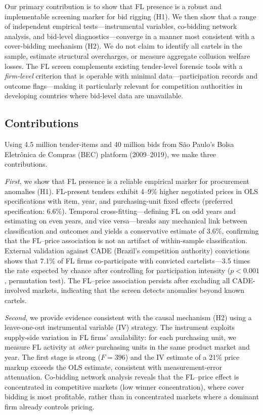 \noindent Our primary contribution is to show that FL presence is a
robust and implementable screening marker for bid rigging (H1). We then
show that a range of independent empirical tests---instrumental
variables, co-bidding network analysis, and bid-level
diagnostics---converge in a manner most consistent with a cover-bidding
mechanism (H2). We do not claim to identify all cartels in the sample,
estimate structural overcharges, or measure aggregate collusion welfare
losses. The FL screen complements existing tender-level forensic tools
\citep{imhof2019detecting} with a \emph{firm-level} criterion that is
operable with minimal data---participation records and outcome
flags---making it particularly relevant for competition authorities in
developing countries where bid-level data are unavailable.

\subsection{Contributions}

Using 4.5 million tender-items and 40 million bids from S\~ao Paulo's
Bolsa Eletr\^onica de Compras (BEC) platform (2009--2019), we make three
contributions.

\emph{First}, we show that FL presence is a reliable empirical marker %
for procurement anomalies (H1). FL-present tenders exhibit 4--9\%
higher negotiated prices in OLS specifications with item, year, and
purchasing-unit fixed effects (preferred specification: 6.6\%).
Temporal cross-fitting---defining FL on odd years and estimating on
even years, and vice versa---breaks any mechanical link between
classification and outcomes and yields a conservative estimate of
3.6\%, confirming that the FL--price association is not an artifact
of within-sample classification. External validation against CADE
(Brazil's competition authority) convictions shows that 7.1\% of FL
firms co-participate with convicted cartelists---3.5 times the rate
expected by chance after controlling for participation intensity
($p < 0.001$, permutation test). The FL--price association persists
after excluding all CADE-involved markets, indicating that the screen
detects anomalies beyond known cartels.

\emph{Second}, we provide evidence consistent with the causal mechanism
(H2) using a leave-one-out instrumental variable (IV) strategy. The
instrument exploits supply-side variation in FL firms' availability: for
each purchasing unit, we measure FL activity at \emph{other} purchasing
units in the same product market and year. The first stage is strong
($F = 396$) and the IV estimate of a 21\% price markup exceeds the OLS
estimate, consistent with measurement-error attenuation. Co-bidding
network analysis reveals that the FL--price effect is concentrated in
competitive markets (low winner concentration), where cover bidding is
most profitable, rather than in concentrated markets where a dominant
firm already controls pricing.

